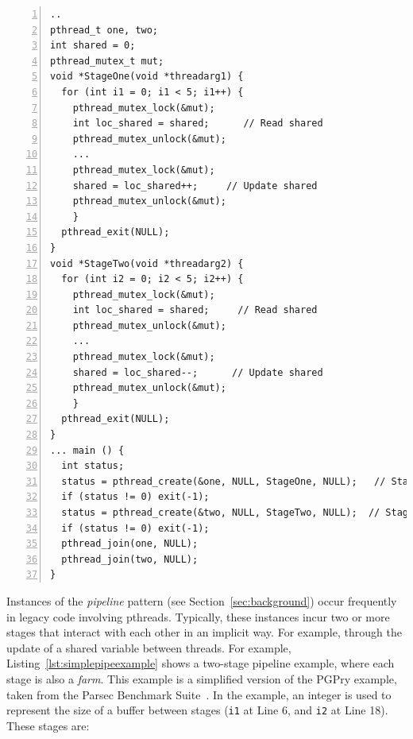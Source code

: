 \begin{lstlisting}[frame=single,numbers=left,label=lst:simplepipeexample,caption={Simple pipeline example, based on PGPry, from the Parsec benchmark suite.}]
..
pthread_t one, two;
int shared = 0;
pthread_mutex_t mut;
void *StageOne(void *threadarg1) {
  for (int i1 = 0; i1 < 5; i1++) {
    pthread_mutex_lock(&mut);
    int loc_shared = shared;      // Read shared
    pthread_mutex_unlock(&mut);
    ...
    pthread_mutex_lock(&mut);
    shared = loc_shared++;     // Update shared
    pthread_mutex_unlock(&mut);
    }
  pthread_exit(NULL);
}
void *StageTwo(void *threadarg2) {
  for (int i2 = 0; i2 < 5; i2++) { 
    pthread_mutex_lock(&mut);
    int loc_shared = shared;     // Read shared
    pthread_mutex_unlock(&mut);
    ...
    pthread_mutex_lock(&mut);
    shared = loc_shared--;      // Update shared
    pthread_mutex_unlock(&mut);
    }
  pthread_exit(NULL);
}
... main () {
  int status;
  status = pthread_create(&one, NULL, StageOne, NULL);   // Stage One
  if (status != 0) exit(-1);
  status = pthread_create(&two, NULL, StageTwo, NULL);  // Stage Two
  if (status != 0) exit(-1);
  pthread_join(one, NULL);
  pthread_join(two, NULL);
}
\end{lstlisting}



Instances of the \emph{pipeline} pattern (see Section~\ref{sec:background}) occur frequently in legacy code involving pthreads. Typically, these instances incur two or more stages that interact with each other in an implicit way. For example, through the update of a shared variable between threads. For example, Listing~\ref{lst:simplepipeexample} shows a two-stage pipeline example, where each stage is also a \emph{farm}. This example is a simplified version of the PGPry example, taken from the Parsec Benchmark Suite~\cite{parsec}. In the example, an integer is used to represent the size of a buffer between stages (\lstinline|i1| at Line 6, and \lstinline|i2| at Line 18).
These stages are:

